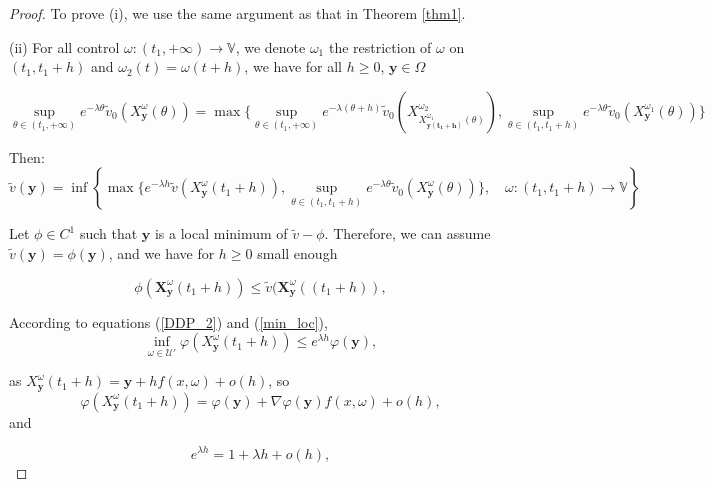 \documentclass[]{interact}
\theoremstyle{plain}%
\theoremstyle{definition}
\theoremstyle{remark}
\begin{document}
\begin{proof}
 To prove (i), we use the same argument as that in Theorem \ref{thm1}.
 
 (ii) For all control $ \omega : (t_{1}, +\infty) \rightarrow \mathbb{V}$, we denote $\omega_{1}$ the restriction of $\omega$ on $(t_{1},t_{1}+ h)$ and $\omega_{2}(t)= \omega(t+h)$, we have for all $h \geq 0$, $\mathbf{y} \in \Omega$
 
\begin{equation*}
\sup_{\theta \in (t_{1}, +\infty)} e^{- \lambda \theta}\tilde{v}_{0}(X_{\mathbf{y}}^{\omega}(\theta)) = \max\lbrace \sup_{\theta \in (t_{1}, +\infty)} e^{- \lambda (\theta + h )}\tilde{v}_{0}(X^{\omega_2}_{X^{\omega_1}_\mathbf{y(t_{1}+h)}(\theta)} ),\sup_{\theta \in (t_{1}, t_{1}+ h)} e^{- \lambda \theta}\tilde{v}_{0}(X_{\mathbf{y}}^{\omega_{1}}(\theta))\rbrace
\end{equation*}

Then: 
\begin{equation}\label{DDP_2}
\tilde{v}(\mathbf{y}) = \inf \left\lbrace \max\lbrace  e^{- \lambda  h }\tilde{v}(X_{\mathbf{y}}^{\omega}(t_{1}+ h) ),\sup_{\theta \in (t_{1}, t_{1}+ h)} e^{- \lambda \theta}\tilde{v}_{0}(X_{\mathbf{y}}^{\omega}(\theta))\rbrace , \quad \omega : (t_{1}, t_{1} +h) \rightarrow \mathbb{V}  \right\rbrace 
\end{equation}

Let \( \phi \in C^1 \) such that  $ \mathbf{y}$ is a local minimum of \( \tilde v - \phi \). Therefore, we can assume \( \tilde v (\mathbf{y}) = \phi(\mathbf{y}) \), and we have for $h \geq 0$ small enough

\begin{equation}\label{min_loc}
\phi(\mathbf{X}_\mathbf{y}^{\omega}(t_{1}+ h) ) \leq \tilde v(\mathbf{X}_\mathbf{y}^{\omega}((t_{1}+ h) ),
\end{equation}


According to equations (\ref{DDP_2}) and (\ref{min_loc}),
\begin{equation}
\inf_{\omega \in \mathcal{U'}}\varphi(X_{\mathbf{y}}^{\omega}(t_{1}+ h) ) \leq e^{\lambda  h } \varphi(\mathbf{y}),
\end{equation}

as $X^{\omega}_{\mathbf{y}}(t_{1}+h)=\mathbf{y} +h f(x,\omega)+o(h)$, so
$$
\varphi\left(X^{\omega}_{\mathbf{y}}(t_{1}+h)\right)=\varphi(\mathbf{y})+\nabla \varphi(\mathbf{y}) f(x,\omega)+o(h),
$$
and 

$$
e^{ \lambda h} = 1+ \lambda h+ o(h),
$$


\end{proof}
\end{document}
